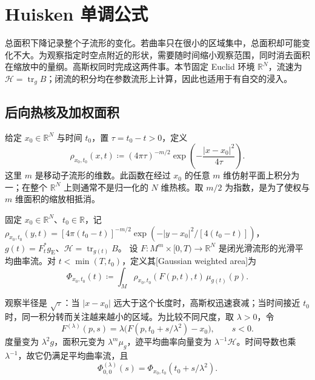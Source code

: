 
% 
% 

\section{Huisken 单调公式}
\label{g3:sec:2803}

总面积下降记录整个子流形的变化。若曲率只在很小的区域集中，总面积却可能变化不大。为观察指定时空点附近的形状，需要随时间缩小观察范围，同时消去面积在缩放中的量纲。高斯权同时完成这两件事。本节固定 Euclid 环境 \(\mathbb R^N\)，流速为 \(\mathcal H=\operatorname{tr}_gB\)；闭流的积分均在参数流形上计算，因此也适用于有自交的浸入。

\subsection{后向热核及加权面积}
\label{g3:subsec:2803:01}
给定 \(x_0\in\mathbb R^N\) 与时间 \(t_0\)，置 \(\tau=t_0-t>0\)，定义
\begin{equation}\label{g3:eq:mcf-backward-gaussian}
	\rho_{x_0,t_0}(x,t)
	\coloneqq(4\pi\tau)^{-m/2}
	\exp\!\left(-\frac{|x-x_0|^2}{4\tau}\right).
\end{equation}
这里 \(m\) 是移动子流形的维数。此函数在经过 \(x_0\) 的任意 \(m\) 维仿射平面上积分为一；在整个 \(\mathbb R^N\) 上则通常不是归一化的 \(N\) 维热核。取 \(m/2\) 为指数，是为了使权与 \(m\) 维面积的缩放相抵消。

\begin{definition}\label{g3:def:mcf-gaussian-area}
	固定 \(x_0\in\mathbb R^N\)、\(t_0\in\mathbb R\)，记 \(\rho_{x_0,t_0}(y,t)=[4\pi(t_0-t)]^{-m/2}\exp(-|y-x_0|^2/[4(t_0-t)])\)，\(g(t)=F_t^*g_{\mathrm E}\)、\(\mathcal H=\operatorname{tr}_{g(t)}B\)。
	设 \(F:M^m\times[0,T)\to\mathbb R^N\) 是闭光滑流形的光滑平均曲率流。对 \(t<\min(T,t_0)\)，定义其[Gaussian weighted area]为
	\[
		\Phi_{x_0,t_0}(t)
		\coloneqq\int_M\rho_{x_0,t_0}(F(p,t),t)\,\mu_{g(t)}(p).
	\]
\end{definition}

观察半径是 \(\sqrt\tau\)：当 \(|x-x_0|\) 远大于这个长度时，高斯权迅速衰减；当时间接近 \(t_0\) 时，同一积分转而关注越来越小的区域。为比较不同尺度，取 \(\lambda>0\)，令
\begin{equation}\label{g3:eq:mcf-parabolic-rescaling}
	F^{(\lambda)}(p,s)
	=\lambda\bigl(F(p,t_0+s/\lambda^2)-x_0\bigr),\qquad s<0.
\end{equation}
度量变为 \(\lambda^2g\)，面积元变为 \(\lambda^m\mu_g\)，迹平均曲率向量变为 \(\lambda^{-1}\mathcal H\)。时间导数也乘 \(\lambda^{-1}\)，故它仍满足平均曲率流，且
\begin{equation}\label{g3:eq:mcf-gaussian-scale-invariance}
	\Phi^{(\lambda)}_{0,0}(s)
	=\Phi_{x_0,t_0}(t_0+s/\lambda^2).
\end{equation}

